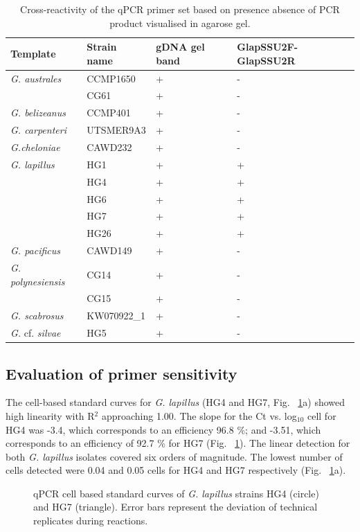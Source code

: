 \documentclass[10pt,letterpaper]{article}
\begin{document}
\begin{table}
\caption{Cross-reactivity of the qPCR primer set based on presence absence of PCR product visualised in agarose gel.}
\label{tbl:CrossreactTable}
\begin{tabular}{ | p{4cm} | p{3cm} | p{2cm} | p{2.5cm} | }%
\hline
\textbf{Template} & \textbf{Strain name} & \textbf{gDNA gel band} & \textbf{GlapSSU2F-GlapSSU2R} \\
\hline
\emph{G. australes} & CCMP1650 &+&-\\
\hline
& CG61 &+&-\\
\hline
\emph{G. belizeanus}&CCMP401&+&-\\
\hline
\emph{G. carpenteri}&UTSMER9A3&+&-\\
\hline
\emph{G.cheloniae}&CAWD232&+&-\\
\hline
\emph{G. lapillus}&HG1&+&+\\
\hline
&HG4&+&+\\
\hline
&HG6&+&+\\
\hline
&HG7&+&+\\
\hline
&HG26&+&+\\
\hline
\emph{G. pacificus}&CAWD149&+&-\\
\hline
\emph{G. polynesiensis}&CG14&+&-\\
\hline
&CG15&+&-\\
\hline
\emph{G. scabrosus}&KW070922\_1&+&-\\
\hline
\emph{G.} cf. \emph{silvae}&HG5&+&-\\
\hline
\end{tabular}
\end{table}
\FloatBarrier

\subsection*{Evaluation of primer sensitivity}
\FloatBarrier
The cell-based standard curves for \emph{G. lapillus} (HG4 and HG7, Fig. ~\ref{fig:stdCurve}a) showed high linearity with R$^{2}$ approaching 1.00. 
The slope for the Ct vs. log$_{10}$ cell for HG4  was -3.4, which corresponds to an efficiency 96.8 \%; and -3.51, which corresponds to an efficiency of 92.7 \% for HG7 (Fig. ~\ref{fig:stdCurve}). 
The linear detection for both \emph{G. lapillus} isolates covered six orders of magnitude. 
The lowest number of cells detected were 0.04 and 0.05 cells for HG4 and HG7 respectively (Fig. ~\ref{fig:stdCurve}a).
\begin{figure}
\caption{qPCR cell based standard curves of \emph{G. lapillus} strains HG4 (circle) and HG7 (triangle). Error bars represent the deviation of technical replicates during reactions.}
\label{fig:stdCurve}
\end{figure}
\end{document}
